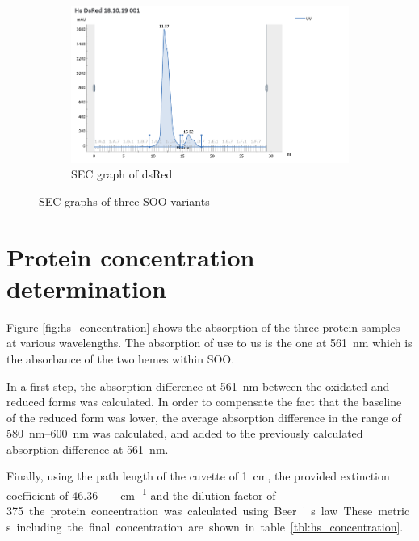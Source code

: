 \begin{figure}[h]
    \begin{subfigure}{0.45\textwidth}
        \includegraphics[width=\textwidth]{img/sec_dsred}
        \caption{SEC graph of dsRed}
        \label{fig:sec_dsred}
    \end{subfigure}
    \caption{SEC graphs of three SOO variants}
    \label{fig:sec}
\end{figure}

\section{Protein concentration determination}

Figure \ref{fig:hs_concentration} shows the absorption of the three protein
samples at various wavelengths. The absorption of use to us is the one at
\SI{561}{\nm} which is the absorbance of the two hemes within SOO.

In a first step, the absorption difference at \SI{561}{\nm} between the
oxidated and reduced forms was calculated. In order to compensate the fact that
the baseline of the reduced form was lower, the average absorption difference
in the range of \SIrange{580}{600}{\nm} was calculated, and added to the
previously calculated absorption difference at \SI{561}{\nm}.

Finally, using the path length of the cuvette of \SI{1}{\cm}, the provided
extinction coefficient of \SI{46.36}{\per\milli\Molar\per\cm} and the dilution
factor of \SI{375} the protein concentration was calculated using Beer's law.
These metrics including the final concentration are shown in table
\ref{tbl:hs_concentration}.

